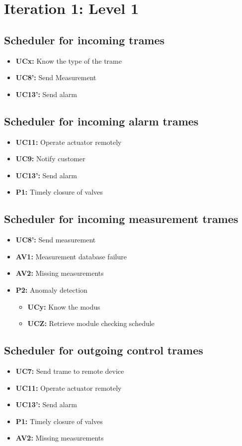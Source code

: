 \section{Iteration 1: Level 1}
\subsection{Scheduler for incoming trames}
\begin{itemize}
	\item \textbf{UCx: } Know the type of the trame
	\item \textbf{UC8': } Send Measurement
	\item \textbf{UC13': } Send alarm
\end{itemize}

\subsection{Scheduler for incoming alarm trames}
\begin{itemize}
	\item \textbf{UC11: } Operate actuator remotely
	\item \textbf{UC9: } Notify customer
	\item \textbf{UC13': } Send alarm
	\item \textbf{P1: } Timely closure of valves
\end{itemize}

\subsection{Scheduler for incoming measurement trames}
\begin{itemize}
	\item \textbf{UC8': } Send measurement
	\item \textbf{AV1: } Measurement database failure
	\item \textbf{AV2: } Missing measurements
	\item \textbf{P2: } Anomaly detection
	\begin{itemize}
		\item \textbf{UCy: } Know the modus
		\item \textbf{UCZ: } Retrieve module checking schedule
	\end{itemize}
\end{itemize}

\subsection{Scheduler for outgoing control trames}
\begin{itemize}
	\item \textbf{UC7: } Send trame to remote device
	\item \textbf{UC11: } Operate actuator remotely
	\item \textbf{UC13': } Send alarm
	\item \textbf{P1: } Timely closure of valves
	\item \textbf{AV2: } Missing measurements
\end{itemize}

